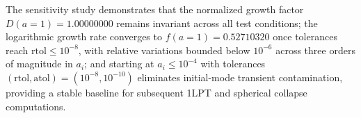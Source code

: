 The sensitivity study demonstrates that the normalized growth factor $D(a=1) = 1.00000000$ remains invariant across all test conditions; the logarithmic growth rate converges to $f(a=1) = 0.52710320$ once tolerances reach $\mathrm{rtol} \le 10^{-8}$, with relative variations bounded below $10^{-6}$ across three orders of magnitude in $a_i$; and starting at $a_i \le 10^{-4}$ with tolerances $(\mathrm{rtol}, \mathrm{atol}) = (10^{-8}, 10^{-10})$ eliminates initial-mode transient contamination, providing a stable baseline for subsequent 1LPT and spherical collapse computations.